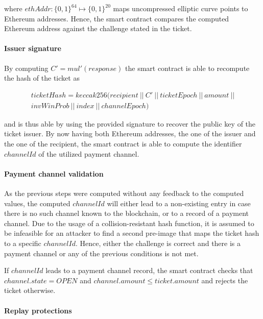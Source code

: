 where $ethAddr: \{0,1\}^{64} \mapsto \{0,1\}^{20}$ maps uncompressed elliptic curve points to Ethereum addresses. Hence, the smart contract compares the computed Ethereum address against the challenge stated in the ticket.

\paragraph{Issuer signature}
\label{sec:tickets:redemption:signature}

By computing $C' = mul'(response)$ the smart contract is able to recompute the hash of the ticket as

\begin{multline*}
      ticketHash = keccak256 (recipient \ || \ C' \ || \ ticketEpoch \ || \ amount \ || \\
      invWinProb \ || \ index \ || \ channelEpoch)
\end{multline*}

and is thus able by using the provided signature to recover the public key of the ticket issuer. By now having both Ethereum addresses, the one of the issuer and the one of the recipient, the smart contract is able to compute the identifier $channelId$ of the utilized payment channel.

\paragraph{Payment channel validation}
\label{sec:tickets:redemption:channel}

As the previous steps were computed without any feedback to the computed values, the computed $channelId$ will either lead to a non-existing entry in case there is no such channel known to the blockchain, or to a record of a payment channel. Due to the usage of a collision-resistant hash function, it is assumed to be infeasible for an attacker to find a second pre-image that maps the ticket hash to a specific $channelId$. Hence, either the challenge is correct and there is a payment channel or any of the previous conditions is not met.

If $channelId$ leads to a payment channel record, the smart contract checks that $channel.state = OPEN$  and $channel.amount \le ticket.amount$ and rejects the ticket otherwise.

\paragraph{Replay protections}
\label{sec:tickets:redemption:replay}

